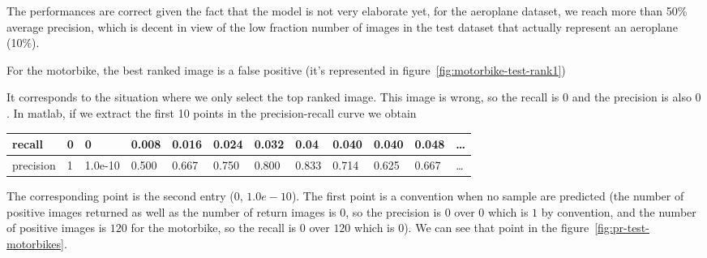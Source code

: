 \documentclass{article}
\begin{document}
The performances are correct given the fact that the model is not very
elaborate yet, for the aeroplane dataset, we reach more than 50\%
average precision, which is decent in view of the low fraction number
of images in the test dataset that actually represent an aeroplane
(10\%).






For the motorbike, the best ranked image is a false positive (it's
represented in figure~\ref{fig:motorbike-test-rank1})


It corresponds to the situation where we only select the top ranked
image. This image is wrong, so the recall is $0$ and the precision is
also $0$. In matlab, if we extract the first 10 points in the precision-recall
curve we obtain
\begin{center}
  \begin{tabular}{| l | l | l | l | l | l | l | l | l | l | l | l }
    \hline
    recall & 0 & 0 & 0.008 & 0.016 & 0.024 & 0.032 & 0.04 & 0.040 & 0.040 & 0.048 & \dots \\
    \hline
    precision & 1 & 1.0e-10 & 0.500 & 0.667 & 0.750 & 0.800 & 0.833 & 0.714 & 0.625 & 0.667 & \dots \\
    \hline
  \end{tabular}
\end{center}
The corresponding point is the second entry ($0$, $1.0e-10$).  The
first point is a convention when no sample are predicted (the
number of positive images returned as well as the number of return
images is $0$, so the precision is $0$ over $0$ which is $1$ by
convention, and the number of positive images is $120$ for the
motorbike, so the recall is $0$ over $120$ which is $0$).
We can see that point in the figure~\ref{fig:pr-test-motorbikes}.
\end{document}
